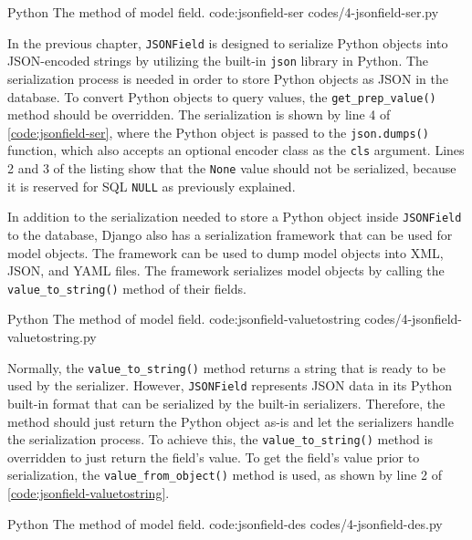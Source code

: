 \listing
{Python}
{The  method of  model field.}
{code:jsonfield-ser}
{codes/4-jsonfield-ser.py}

In the previous chapter, \verb|JSONField| is designed to serialize Python
objects into JSON-encoded strings by utilizing the built-in \verb|json| library
in Python. The serialization process is needed in order to store Python objects
as JSON in the database. To convert Python objects to query values, the
\verb|get_prep_value()| method should be overridden. The serialization is shown
by line 4 of \autoref{code:jsonfield-ser}, where the Python object is passed
to the \verb|json.dumps()| function, which also accepts an optional encoder
class as the \verb|cls| argument. Lines 2 and 3 of the listing show that the
\verb|None| value should not be serialized, because it is reserved for SQL
\verb|NULL| as previously explained.

In addition to the serialization needed to store a Python object inside
\verb|JSONField| to the database, Django also has a serialization framework
that can be used for model objects. The framework can be used to dump model
objects into XML, JSON, and YAML files. The framework serializes model objects
by calling the \verb|value_to_string()| method of their fields.

\listing
{Python}
{The  method of  model field.}
{code:jsonfield-valuetostring}
{codes/4-jsonfield-valuetostring.py}

Normally, the \verb|value_to_string()| method returns a string that is ready to
be used by the serializer. However, \verb|JSONField| represents JSON data in
its Python built-in format that can be serialized by the built-in serializers.
Therefore, the method should just return the Python object as-is and let the
serializers handle the serialization process. To achieve this, the
\verb|value_to_string()| method is overridden to just return the field's value.
To get the field's value prior to serialization, the \verb|value_from_object()|
method is used, as shown by line 2 of \autoref{code:jsonfield-valuetostring}.

\listing
{Python}
{The  method of  model field.}
{code:jsonfield-des}
{codes/4-jsonfield-des.py}

